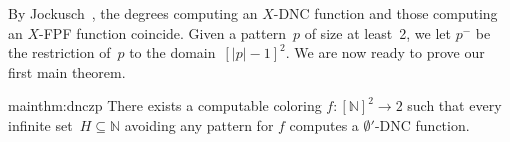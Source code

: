 \documentclass{article}
\newcommand{\NN}[0]{\mathbb{N}}
\def\NN{\mathbb{N}}
\numberwithin{theorem}{section}
\theoremstyle{definition}
\begin{document}
By Jockusch~\cite{jockusch1989recursively}, the degrees computing an $X$-DNC function and those computing an $X$-FPF function coincide. 
Given a pattern~$p$ of size at least~2, we let $p^-$ be the restriction of~$p$ to the domain~$[|p|-1]^2$. We are now ready to prove our first main theorem.


\begin{repmaintheorem}{mainthm:dnczp}
    There exists a computable coloring $f : [\NN]^2 \to 2$ such that every infinite set~$H \subseteq \NN$ avoiding any pattern for $f$ computes a $\emptyset'$-DNC function.
\end{repmaintheorem}
\end{document}
